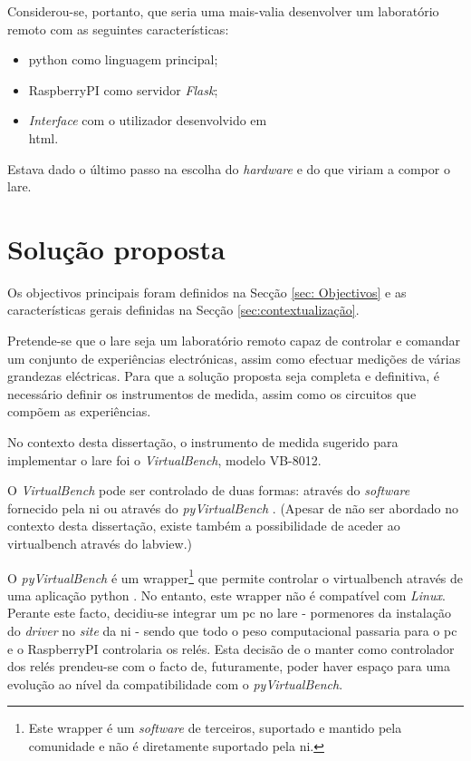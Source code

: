 Considerou-se, portanto, que seria uma mais-valia desenvolver um \acrshort{laboratório remoto} com as seguintes características:
\begin{itemize}
    \item \gls{python} como linguagem principal;
    \item \gls{RaspberryPI} como servidor \textit{Flask};
    \item \textit{Interface} com o utilizador desenvolvido em \\
          \acrfull{html}.
\end{itemize}

Estava dado o último passo na escolha do \textit{hardware} e do  que viriam a compor o \acrshort{lare}.

\section{Solução proposta}
\label{sec:solucaoproposta}
Os objectivos principais foram definidos na Secção \ref{sec: Objectivos} e as características gerais definidas na Secção \ref{sec:contextualização}.

Pretende-se que o \acrshort{lare} seja um \acrshort{laboratório remoto} capaz de controlar e comandar um conjunto de experiências electrónicas, assim como efectuar medições de várias grandezas eléctricas. Para que a solução proposta seja completa e definitiva, é necessário definir os instrumentos de medida, assim como os circuitos que compõem as experiências.

No contexto desta dissertação, o instrumento de medida sugerido para implementar o \acrshort{lare} foi o \textit{VirtualBench}, modelo VB-8012.

O \textit{VirtualBench} pode ser controlado de duas formas: através do \textit{software} fornecido pela \acrshort{ni} ou através do \textit{pyVirtualBench} \cite{AutomatingVB}. (Apesar de não ser abordado no contexto desta dissertação, existe também a possibilidade de aceder ao \acrshort{virtualbench} através do \acrshort{labview}.)

O \textit{pyVirtualBench} é um \gls{wrapper}\footnote{Este \gls{wrapper} é um \textit{software} de terceiros, suportado e mantido pela comunidade e não é diretamente suportado pela \acrshort{ni}.} que permite controlar o \acrshort{virtualbench} através de uma aplicação \gls{python} \cite{pyvirtualbench}. No entanto, este \gls{wrapper} não é compatível com \textit{Linux}.
Perante este facto, decidiu-se integrar um \acrshort{pc} no \acrshort{lare} - pormenores da instalação do \textit{driver} no \textit{site} da \acrshort{ni} \cite{AutomatingVB} - sendo que todo o peso computacional passaria para o \acrshort{pc} e o \gls{RaspberryPI} controlaria os relés. Esta decisão de o manter como controlador dos relés prendeu-se com o facto de, futuramente, poder haver espaço para uma evolução ao nível da compatibilidade com o \textit{pyVirtualBench}.

